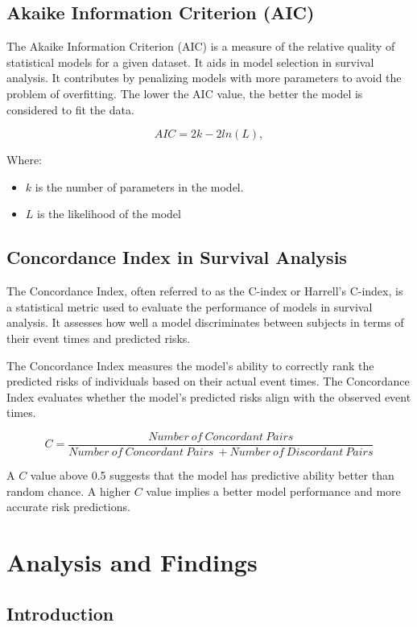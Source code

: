 \documentclass[doublespacing]{report} %
\begin{document}
\section{Akaike Information Criterion (AIC)}

The Akaike Information Criterion (AIC) is a measure of the relative quality of statistical models for a given dataset. It aids in model selection in survival analysis. It contributes by penalizing models with more parameters to avoid the problem of overfitting. The lower the AIC value, the better the model is considered to fit the data.

\[AIC=2k-2ln(L),\]

Where:
 \begin{itemize}
     \item \(k \) is the number of parameters in the model.
     \item \(L\) is the likelihood of the model
 \end{itemize}

\section{Concordance Index in Survival Analysis}

The Concordance Index, often referred to as the C-index or Harrell's C-index, is a statistical metric used to evaluate the performance of models in survival analysis. It assesses how well a model discriminates between subjects in terms of their event times and predicted risks. 

The Concordance Index measures the model's ability to correctly rank the predicted risks of individuals based on their actual event times. The Concordance Index evaluates whether the model's predicted risks align with the observed event times.

\[C=\frac{Number\ of\ Concordant\ Pairs}{Number\ of\ Concordant\ Pairs\ +Number\ of\ Discordant\ Pairs}\]

A \(C\) value above 0.5 suggests that the model has predictive ability better than random chance. A higher \(C\) value implies a better model performance and more accurate risk predictions.



\newpage
\chapter{Analysis and Findings}
\section{Introduction}
\end{document}
